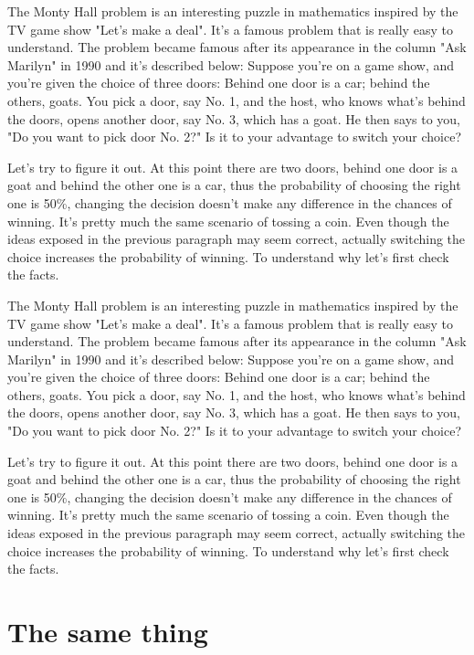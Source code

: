 \documentclass[preprint]{oscmjournal}
\begin{document}
The Monty Hall problem is an interesting puzzle in mathematics inspired by the TV  game show "Let's make a deal". It's a famous problem that is really easy to understand. The problem became famous after its appearance in the column "Ask Marilyn" in 1990 and  it's described below: Suppose you're on a game show, and you're given the choice of three doors: Behind one  door is a car; behind the others, goats. You pick a door, say No. 1, and the host, who  knows what's behind the doors, opens another door, say No. 3, which has a goat. He then  says to you, "Do you want to pick door No. 2?" Is it to your advantage to switch your choice?

Let's try to figure it out. At this point there are two doors, behind one door is a goat  and behind the other one is a car, thus the probability of choosing the right one is 50\%, changing the decision doesn't make any difference in the chances of winning. It's pretty much the same scenario of tossing a coin. Even though the ideas exposed in the previous paragraph may seem correct, actually switching the choice increases the probability of winning. To understand why let's  first check the facts.

The Monty Hall problem is an interesting puzzle in mathematics inspired by the TV  game show "Let's make a deal". It's a famous problem that is really easy to understand. The problem became famous after its appearance in the column "Ask Marilyn" in 1990 and  it's described below: Suppose you're on a game show, and you're given the choice of three doors: Behind one  door is a car; behind the others, goats. You pick a door, say No. 1, and the host, who  knows what's behind the doors, opens another door, say No. 3, which has a goat. He then  says to you, "Do you want to pick door No. 2?" Is it to your advantage to switch your choice?

Let's try to figure it out. At this point there are two doors, behind one door is a goat  and behind the other one is a car, thus the probability of choosing the right one is 50\%, changing the decision doesn't make any difference in the chances of winning. It's pretty much the same scenario of tossing a coin. Even though the ideas exposed in the previous paragraph may seem correct, actually switching the choice increases the probability of winning. To understand why let's  first check the facts.

\section{The same thing}
\end{document}
